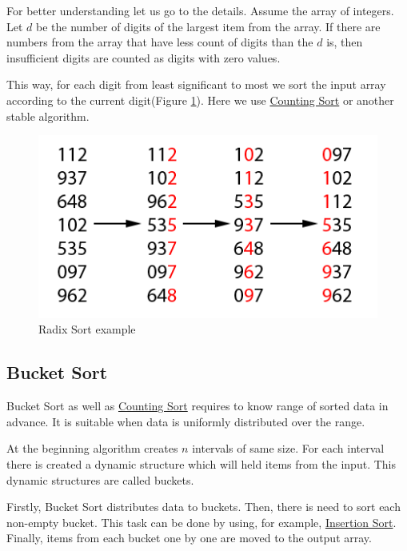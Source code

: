 \documentclass[
  field=inf,
  biblatex,
  language=english,
  glossaries,
  theorems=false,
  index
]{kidiplom}
\begin{document}
For better understanding let us go to the details. Assume the array of integers. Let $d$ be the number of digits of the largest item from the array. If there are numbers from the array that have less count of digits than the $d$ is, then insufficient digits are counted as digits with zero values.

This way, for each digit from least significant to most we sort the input array according to the current digit(Figure \ref{fig:radixsort}). Here we use \hyperref[sec:counting]{Counting Sort} or another stable algorithm.

\begin{figure}[H]
\begin{center}
	
	\includegraphics[scale=2]{img/Radixsort.png}
	\caption{Radix Sort example}\label{fig:radixsort}
\end{center}
\end{figure}

\subsection{Bucket Sort}

Bucket Sort as well as \hyperref[sec:counting]{Counting Sort} requires to know range of sorted data in advance. It is suitable when data is uniformly distributed over the range.

At the beginning algorithm creates $n$ intervals of same size. For each interval there is created a dynamic structure which will held items from the input. This dynamic structures are called buckets.

Firstly, Bucket Sort distributes data to buckets. Then, there is need to sort each non-empty bucket. This task can be done by using, for example, \hyperref[sec:insertion]{Insertion Sort}. Finally, items from each bucket one by one are moved to the output array.
\end{document}

